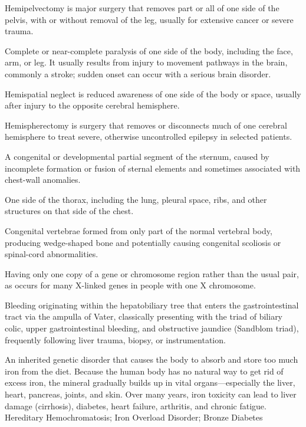  Hemipelvectomy is major surgery that removes part or all of one side of the pelvis, with or without removal of the leg, usually for extensive cancer or severe trauma.

 Complete or near-complete paralysis of one side of the body, including the face, arm, or leg. It usually results from injury to movement pathways in the brain, commonly a stroke; sudden onset can occur with a serious brain disorder.

 Hemispatial neglect is reduced awareness of one side of the body or space, usually after injury to the opposite cerebral hemisphere.

 Hemispherectomy is surgery that removes or disconnects much of one cerebral hemisphere to treat severe, otherwise uncontrolled epilepsy in selected patients.

 A congenital or developmental partial segment of the sternum, caused by incomplete formation or fusion of sternal elements and sometimes associated with chest-wall anomalies.

 One side of the thorax, including the lung, pleural space, ribs, and other structures on that side of the chest.

 Congenital vertebrae formed from only part of the normal vertebral body, producing wedge-shaped bone and potentially causing congenital scoliosis or spinal-cord abnormalities.

 Having only one copy of a gene or chromosome region rather than the usual pair, as occurs for many X-linked genes in people with one X chromosome.

 Bleeding originating within the hepatobiliary tree that enters the gastrointestinal tract via the ampulla of Vater, classically presenting with the triad of biliary colic, upper gastrointestinal bleeding, and obstructive jaundice (Sandblom triad), frequently following liver trauma, biopsy, or instrumentation.

 An inherited genetic disorder that causes the body to absorb and store too much iron from the diet. Because the human body has no natural way to get rid of excess iron, the mineral gradually builds up in vital organs---especially the liver, heart, pancreas, joints, and skin. Over many years, iron toxicity can lead to liver damage (cirrhosis), diabetes, heart failure, arthritis, and chronic fatigue.
\synonyms
Hereditary Hemochromatosis; Iron Overload Disorder; Bronze Diabetes

